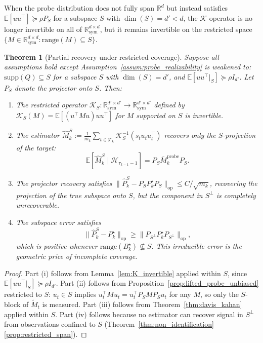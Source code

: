 \documentclass[12pt]{article}
\newcommand{\R}{\mathbb{R}}
\newcommand{\E}{\mathbb{E}}
\newcommand{\op}{\mathrm{op}}
\newcommand{\cH}{\mathcal{H}}
\newcommand{\cT}{\mathcal{T}}
\newcommand{\Rsy}{\mathbb{R}^{d\times d}_{\mathrm{sym}}}
\newcommand{\range}{\mathrm{range}}
\newcommand{\supp}{\mathrm{supp}}
\newtheorem{theorem}{Theorem}
\theoremstyle{plain}
\theoremstyle{definition}
\begin{document}
When the probe distribution does not fully span $\R^d$ but instead satisfies $\E[uu^\top] \succeq \rho P_S$ for a subspace $S$ with $\dim(S) = d' < d$, the $\mathcal{K}$ operator is no longer invertible on all of $\Rsy$, but it remains invertible on the restricted space $\{M \in \Rsy : \range(M) \subseteq S\}$.

\begin{theorem}[Partial recovery under restricted coverage]
\label{thm:robustness_coverage}
Suppose all assumptions hold except Assumption~\ref{assum:probe_realizability} is weakened to: $\supp(Q) \subseteq S$ for a subspace $S$ with $\dim(S) = d'$, and $\E[uu^\top|_S] \succeq \rho I_{d'}$. Let $P_S$ denote the projector onto $S$. Then:
\begin{enumerate}[label=(\roman*)]
\item The restricted operator $\mathcal{K}_S : \R^{d' \times d'}_{\mathrm{sym}} \to \R^{d' \times d'}_{\mathrm{sym}}$ defined by $\mathcal{K}_S(M) = \E[(u^\top M u) uu^\top]$ for $M$ supported on $S$ is invertible.
\item The estimator $\widehat{M}_k^S := \frac{1}{m_k}\sum_{t \in \cT_k} \mathcal{K}_S^{-1}(s_t u_t u_t^\top)$ recovers only the $S$-projection of the target:
\[
\E[\widehat{M}_k^S \mid \cH_{\tau_{k-1}-1}] = P_S \bar{M}_k^{\mathrm{probe}} P_S.
\]
\item The projector recovery satisfies $\|\widehat{P}_k^S - P_S P_k^\star P_S\|_{\op} \le C / \sqrt{m_k}$, recovering the projection of the true subspace onto $S$, but the component in $S^\perp$ is completely unrecoverable.
\item The subspace error satisfies
\[
\|\widehat{P}_k^S - P_k^\star\|_{\op} \ge \|P_{S^\perp} P_k^\star P_{S^\perp}\|_{\op},
\]
which is positive whenever $\range(B_k^\star) \not\subseteq S$. This irreducible error is the geometric price of incomplete coverage.
\end{enumerate}
\end{theorem}

\begin{proof}
Part (i) follows from Lemma~\ref{lem:K_invertible} applied within $S$, since $\E[uu^\top|_S] \succeq \rho I_{d'}$. Part (ii) follows from Proposition~\ref{prop:lifted_probe_unbiased} restricted to $S$: $u_t \in S$ implies $u_t^\top M u_t = u_t^\top P_S M P_S u_t$ for any $M$, so only the $S$-block of $\widetilde{M}_t$ is measured. Part (iii) follows from Theorem~\ref{thm:davis_kahan} applied within $S$. Part (iv) follows because no estimator can recover signal in $S^\perp$ from observations confined to $S$ (Theorem~\ref{thm:non_identification}\ref{prop:restricted_span}).
\end{proof}
\end{document}

